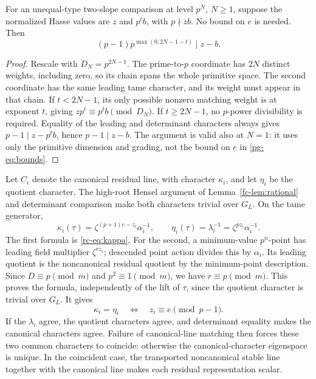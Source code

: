 \begin{lemma}\label{pg-lem:lower-level}
For an unequal-type two-slope comparison at level $p^N$, $N\ge1$, suppose the normalized Hasse values are $z$ and $p^t b$, with $p\nmid zb$. No bound on $e$ is needed. Then
\begin{equation}\label{pg-eq:lower-level}
 (p-1)p^{\max(0,2N-1-t)}\mid z-b.
\end{equation}
\end{lemma}
\begin{proof}
Rescale with $D_N=p^{2N-1}$. The prime-to-$p$ coordinate has $2N$ distinct weights, including zero, so its chain spans the whole primitive space. The second coordinate has the same leading tame character, and its weight must appear in that chain. If $t<2N-1$, its only possible nonzero matching weight is at exponent $t$, giving $zp^t\equiv p^tb\pmod{D_N}$. If $t\ge2N-1$, no $p$-power divisibility is required. Equality of the leading and determinant characters always gives $p-1\mid z-p^tb$, hence $p-1\mid z-b$. The argument is valid also at $N=1$: it uses only the primitive dimension and grading, not the bound on $e$ in \eqref{pg-eq:bounds}.
\end{proof}

Let $C_i$ denote the canonical residual line, with character $\kappa_i$, and let $\eta_i$ be the quotient character. The high-root Hensel argument of Lemma~\ref{fc-lem:rational} and determinant comparison make both characters trivial over $G_L$. On the tame generator,
\begin{equation}\label{pg-eq:residual-characters}
 \kappa_i(\tau)=\zeta^{(p+1)e-z_i}\alpha_i^{-1},
 \qquad \eta_i(\tau)=\lambda_i^{-1}=\zeta^{pz_i}\alpha_i^{-1}.
\end{equation}
The first formula is \eqref{rc-eq:kappa}. For the second, a minimum-value $p^n$-point has leading field multiplier $\zeta^{rz_i}$; descended point action divides this by $\alpha_i$. Its leading quotient is the noncanonical residual quotient by the minimum-point description. Since $D\equiv p\pmod m$ and $p^2\equiv1\pmod m$, we have $r\equiv p\pmod m$. This proves the formula, independently of the lift of $\tau$, since the quotient character is trivial over $G_L$. It gives
\begin{equation}\label{pg-eq:scalar-condition}
 \kappa_i=\eta_i\quad\Longleftrightarrow\quad z_i\equiv e\pmod{p-1}.
\end{equation}
If the $\lambda_i$ agree, the quotient characters agree, and determinant equality makes the canonical characters agree. Failure of canonical-line matching then forces these two common characters to coincide: otherwise the canonical-character eigenspace is unique. In the coincident case, the transported noncanonical stable line together with the canonical line makes each residual representation scalar.

